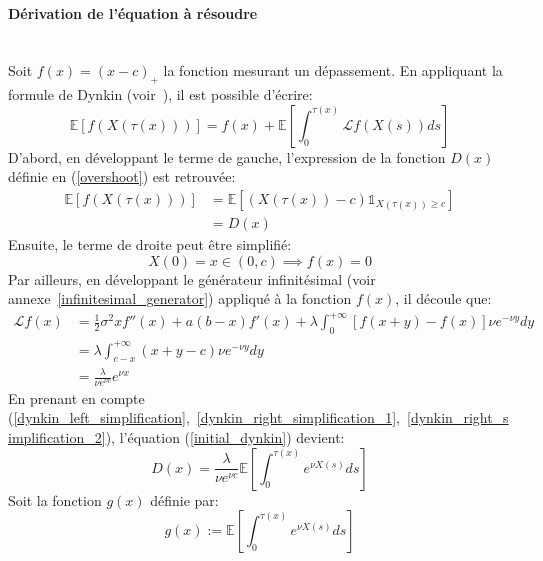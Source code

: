 \paragraph{Dérivation de l'équation à résoudre}\phantom{}\\
Soit $f(x)=(x-c)_+$ la fonction mesurant un dépassement. En appliquant la formule de Dynkin (voir~\cite{dynkin1965}), il est possible d'écrire:
\begin{equation}\label{initial_dynkin}
    \mathds{E}[f(X(\tau(x)))]=f(x)+\mathds{E}\left[\int_0^{\tau(x)}\mathcal{L}f(X(s))ds\right]
\end{equation}
D'abord, en développant le terme de gauche, l'expression de la fonction $D(x)$ définie en (\ref{overshoot}) est retrouvée:
\begin{equation}\label{dynkin_left_simplification}
    \begin{aligned}
        \mathds{E}[f(X(\tau(x)))]&=\mathds{E}\left[(X(\tau(x))-c)\mathds{1}_{X(\tau(x))\geq c}\right]\\
        &=D(x)
    \end{aligned}
\end{equation}
Ensuite, le terme de droite peut être simplifié: 
\begin{equation}\label{dynkin_right_simplification_1}
    X(0)=x\in(0,c)\implies f(x)=0
\end{equation}
Par ailleurs, en développant le générateur infinitésimal (voir annexe~\ref{infinitesimal_generator}) appliqué à la fonction $f(x)$, il découle que:
\begin{equation}\label{dynkin_right_simplification_2}
    \begin{aligned}
        \mathcal{L}f(x)&=\frac{1}{2}\sigma^2xf''(x)+a(b-x)f'(x)+\lambda\int_0^{+\infty}\left[f(x+y)-f(x)\right]\nu e^{-\nu y}dy \\
        &=\lambda\int_{c-x}^{+\infty}(x+y-c)\nu e^{-\nu y}dy \\
        &=\frac{\lambda}{\nu e^{\nu c}}e^{\nu x}
    \end{aligned}
\end{equation}
En prenant en compte (\ref{dynkin_left_simplification},~\ref{dynkin_right_simplification_1},~\ref{dynkin_right_simplification_2}), l'équation (\ref{initial_dynkin}) devient:
\begin{equation}\label{simplified_dynkin}
    D(x)=\frac{\lambda}{\nu e^{\nu c}}\mathds{E}\left[\int_0^{\tau(x)}e^{\nu X(s)}ds\right]
\end{equation}
Soit la fonction $g(x)$ définie par:
\begin{equation}\label{g_defintion}
    g(x):=\mathds{E}\left[\int_0^{\tau(x)}e^{\nu X(s)}ds\right]
\end{equation}
